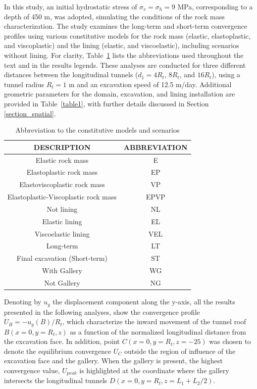 \documentclass[a4paper,fleqn]{cas-sc}
\begin{document}
In this study, an initial hydrostatic stress of $\sigma_v = \sigma_h = 9$ MPa, corresponding to a depth of 450 m, was adopted, simulating the conditions of the rock mass characterization. The study examines the long-term and short-term convergence profiles using various constitutive models for the rock mass (elastic, elastoplastic, and viscoplastic) and the lining (elastic, and viscoelastic), including scenarios without lining. For clarity, Table~\ref{table3} lists the abbreviations used throughout the text and in the results legends. These analyses are conducted for three different distances between the longitudinal tunnels ($d_1 = 4R_t$, $8R_t$, and $16R_t$), using a tunnel radius $R_t=1$ m and an excavation speed of 12.5 m/day. Additional geometric parameters for the domain, excavation, and lining installation are provided in Table~\ref{table1}, with further details discussed in Section~ \ref{section_spatial}.

\FloatBarrier
\begin{table}[h!]
	\caption{Abbreviation to the constitutive models and scenarios}
	\label{table3}
	\centering
	\renewcommand{\arraystretch}{1.25}
	\begin{tabular}{c c}
		\hline
		\multicolumn{1}{c}{DESCRIPTION} &
		\multicolumn{1}{c}{ABBREVIATION} \\
		\hline
		Elastic rock mass & E \\
		Elastoplastic rock mass & EP \\
		Elastoviscoplastic rock mass & VP \\
		Elastoplastic-Viscoplastic rock mass & EPVP \\
		Not lining & NL \\
		Elastic lining & EL \\
		Viscoelastic lining & VEL \\
		Long-term & LT \\
		Final excavation (Short-term) & ST \\
		With Gallery & WG \\
		Not Gallery & NG \\			
		\hline
	\end{tabular}
	\normalsize
\end{table}
\FloatBarrier

Denoting by $u_y$ the displacement component along the y-axis, all the results presented in the following analyses, show the convergence profile $U_B = -u_y(B)/R_t$, which characterize the inward movement of the tunnel roof $B(x = 0, y = R_t, z)$ as a function of the normalized longitudinal distance from the excavation face. In addition, point $C(x=0, y =R_t, z = -25)$ was chosen to denote the equilibrium convergence $U_C$ outside the region of influence of the excavation face and the gallery. When the gallery is present, the highest convergence value, $U_{peak}$ is highlighted at the coordinate where the gallery intersects the longitudinal tunnels $D(x=0, y = R_t, z = L_1+L_2/2)$.
\end{document}
